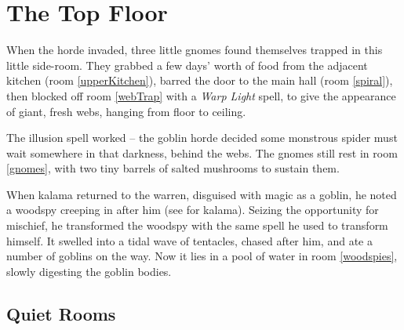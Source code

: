 \chapter{The Top Floor}
\epigraph{
  \iftoggle{hardcore}{
    I have township, yet no houses.
    Forests, but no trees.
    Rivers, but no water.
  }{
    Never resting, never still.

    Moving silently from hill to hill.

    It does not walk, run or trot.

    All is cool where it is not.
  }
}{}

\noindent
When the horde invaded, three little gnomes found themselves trapped in this little side-room.
They grabbed a few days' worth of food from the adjacent kitchen (room \ref{upperKitchen}),
barred the door to the main hall (room \ref{spiral}), then blocked off room \ref{webTrap} with a \textit{Warp Light} spell, to give the appearance of giant, fresh webs, hanging from floor to ceiling.

The illusion spell worked -- the goblin horde decided some monstrous spider must wait somewhere in that darkness, behind the webs.
The gnomes still rest in room \ref{gnomes}, with two tiny barrels of salted mushrooms to sustain them.

When \gls{kalama}%
returned to the warren, disguised with magic as a goblin, he noted a woodspy%
creeping in after him
(see  for \gls{kalama}).
Seizing the opportunity for mischief, he transformed the woodspy with the same spell he used to transform himself.
It swelled into a tidal wave of tentacles, chased after him, and ate a number of goblins on the way.
Now it lies in a pool of water in room \ref{woodspies}, slowly digesting the goblin bodies.

\section{Quiet Rooms}
\label{upper}

